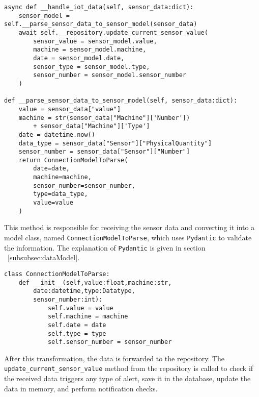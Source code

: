 \begin{Verbatim}[fontsize=\small, baselinestretch=0.8]
async def __handle_iot_data(self, sensor_data:dict):
    sensor_model = self.__parse_sensor_data_to_sensor_model(sensor_data)
    await self.__repository.update_current_sensor_value(
        sensor_value = sensor_model.value,
        machine = sensor_model.machine,
        date = sensor_model.date,
        sensor_type = sensor_model.type,
        sensor_number = sensor_model.sensor_number
    )

def __parse_sensor_data_to_sensor_model(self, sensor_data:dict):
    value = sensor_data["value"]
    machine = str(sensor_data["Machine"]['Number']) 
        + sensor_data["Machine"]['Type']
    date = datetime.now()
    data_type = sensor_data["Sensor"]["PhysicalQuantity"]
    sensor_number = sensor_data["Sensor"]["Number"]
    return ConnectionModelToParse(
        date=date,
        machine=machine,
        sensor_number=sensor_number,
        type=data_type,
        value=value
    )
\end{Verbatim}

This method is responsible for receiving the sensor data and converting it into a model class, named \texttt{ConnectionModelToParse}, which uses \texttt{Pydantic} to validate the information. The explanation of \texttt{Pydantic} is given in section ~\ref{subsubsec:dataModel}.

\begin{Verbatim}[fontsize=\small, baselinestretch=0.8]
class ConnectionModelToParse:
    def __init__(self,value:float,machine:str,
        date:datetime,type:Datatype,
        sensor_number:int):
            self.value = value
            self.machine = machine
            self.date = date
            self.type = type
            self.sensor_number = sensor_number
\end{Verbatim}

After this transformation, the data is forwarded to the repository. The \texttt{update\_current\_sensor\_value} method from the repository is called to check if the received data triggers any type of alert, save it in the database, update the data in memory, and perform notification checks.


